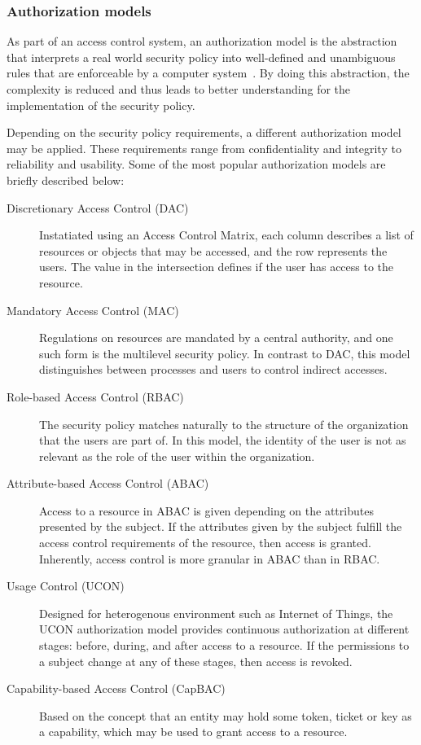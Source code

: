 \documentclass[12pt]{article}
\begin{document}
\subsubsection{Authorization models}

As part of an access control system, an authorization model is the abstraction that interprets a real world security policy into well-defined and unambiguous rules that are enforceable by a computer system~\cite{access_01}. By doing this abstraction, the complexity is reduced and thus leads to better understanding for the implementation of the security policy. 

Depending on the security policy requirements, a different authorization model may be applied. These requirements range from confidentiality and integrity to reliability and usability. Some of the most popular authorization models are briefly described below:

\begin{description}
\item[Discretionary Access Control (DAC)] Instatiated using an Access Control Matrix, each column describes a list of resources or objects that may be accessed, and the row represents the users. The value in the intersection defines if the user has access to the resource.
\item[Mandatory Access Control (MAC)] Regulations on resources are mandated by a central authority, and one such form is the multilevel security policy. In contrast to DAC, this model distinguishes between processes and users to control indirect accesses.
\item[Role-based Access Control (RBAC)] The security policy matches naturally to the structure of the organization that the users are part of. In this model, the identity of the user is not as relevant as the role of the user within the organization.
\item[Attribute-based Access Control (ABAC)] Access to a resource in ABAC is given depending on the attributes presented by the subject. If the attributes given by the subject fulfill the access control requirements of the resource, then access is granted. Inherently, access control is more granular in ABAC than in RBAC.
\item[Usage Control (UCON)] Designed for heterogenous environment such as Internet of Things, the UCON authorization model provides continuous authorization at different stages: before, during, and after access to a resource. If the permissions to a subject change at any of these stages, then access is revoked. 
\item[Capability-based Access Control (CapBAC)] Based on the concept that an entity may hold some token, ticket or key as a capability, which may be used to grant access to a resource. 
\end{description}
\end{document}
